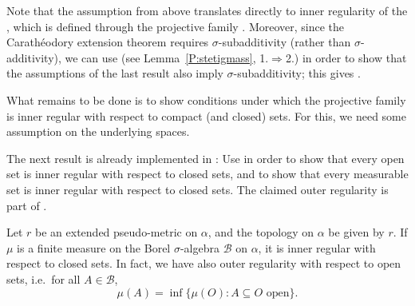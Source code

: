 \documentclass[lean]{AFM}
\begin{document}
Note that the assumption  from above translates
directly to inner regularity of the , which
is defined through the projective family . Moreover, since
the Carathéodory extension theorem requires $\sigma$-subadditivity
(rather than $\sigma$-additivity), we can use
 (see
  Lemma~\ref{P:stetigmass}, 1.$\Rightarrow$2.) in order to show that
the assumptions of the last result also imply $\sigma$-subadditivity;
this gives
.

What remains to be done is to show conditions under which the
projective family is inner regular with respect to compact (and
closed) sets. For this, we need some assumption on the underlying
spaces.

The next result is already implemented in : Use
 in order to show
that every open set is inner regular with respect to closed sets, and
 to show that
every measurable set is inner regular with respect to closed sets.
The claimed outer regularity is part of
.

\begin{lemma}\label{l:pseude1}
  Let $r$ be an extended pseudo-metric on $\alpha$, and the topology
  on $\alpha$ be given by $r$. If $\mu$ is a finite measure on the
  Borel $\sigma$-algebra $\mathcal B$ on $\alpha$, it is inner regular
  with respect to closed sets. In fact, we have also outer regularity
  with respect to open sets, i.e.\ for all $A\in \mathcal B$,
  $$ \mu(A) = \inf \{ \mu(O) : A \subseteq O \text{ open}\}.$$
\end{lemma}
\end{document}
